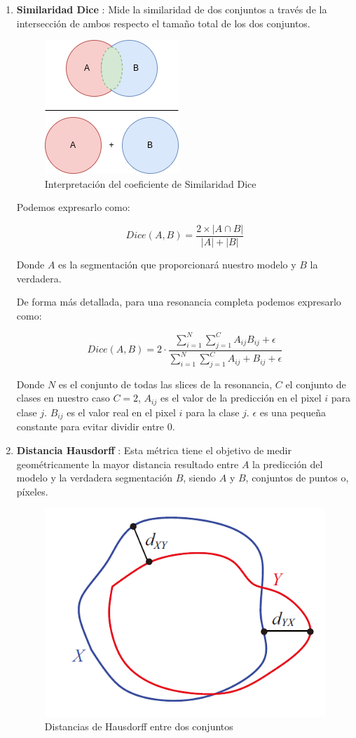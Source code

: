 \begin{enumerate}
	\item \textbf{Similaridad Dice} : Mide la similaridad de dos conjuntos a través de la intersección de ambos respecto el tamaño total de los dos conjuntos.
	
	\begin{figure}[!h]
		\centering
		\includegraphics[width=0.25\linewidth]{imagenes/dicesimilarity.drawio.png}
		\caption{Interpretación del coeficiente de Similaridad Dice}
	\end{figure}
	
	Podemos expresarlo como:
	
	$$ Dice(A, B) = \frac{2 \times |A \cap B|}{|A| + |B|}$$
	
	Donde $A$ es la segmentación que proporcionará nuestro modelo y $B$ la verdadera.
	
	De forma más detallada, para una resonancia completa podemos expresarlo como:
	
	$$ Dice(A, B) =  2 \cdot \frac{\sum_{i=1}^{N} \sum_{j=1}^{C} A_{ij} B_{ij} + \epsilon}{\sum_{i=1}^{N} \sum_{j=1}^{C} A_{ij} + B_{ij} + \epsilon} $$ 
	
	Donde $N$ es el conjunto de todas las slices de la resonancia, $C$ el conjunto de clases en nuestro caso $C = 2$, $A_{ij}$ es el valor de la predicción en el pixel $i$ para clase $j$. $B_{ij}$ es el valor real en el pixel $i$ para la clase $j$. $\epsilon$ es una pequeña constante para evitar dividir entre 0. 
	
	\item \textbf{Distancia Hausdorff} : Esta métrica tiene el objetivo de medir geométricamente la mayor distancia resultado entre $A$ la predicción del modelo y la verdadera segmentación $B$, siendo $A$ y $B$, conjuntos de puntos o, píxeles.
	
	\begin{figure}[H]
		\centering
		\includegraphics[width=0.4\linewidth]{imagenes/distanceHaussdorff.png}
		\caption{Distancias de Hausdorff entre dos conjuntos}
	\end{figure}
	

\end{enumerate}
